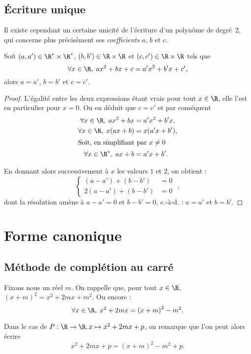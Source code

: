 \subsection{Écriture unique}
Il existe cependant un certaine unicité de l'écriture d'un polynôme de degré~2, qui concerne plus précisément ses \emph{coefficients} $a$, $b$ et $c$.
\begin{thm}
Soit $(a,a')\in\R^*\times\R^*$, $(b,b')\in\R\times\R$ et $(c,c')\in\R\times\R$ tels que
\[\forall x\in\R,\; ax^2+bx+c=a'x^2+b'x+c',\]
alors $a=a'$, $b=b'$ et $c=c'$. 
\label{thunicite}
\end{thm}
\begin{proof}
L'égalité entre les deux expressions étant vraie pour tout $x\in\R$, elle l'est en particulier pour $x=0$. On en déduit que $c=c'$ et par conséquent
\begin{align*}
\forall x\in\R,\; ax^2+bx&=a'x^2+b'x,\\
\forall x\in\R,\; x(ax+b)&=x(a'x+b'),\\
\intertext{Soit, en simplifiant par $x\neq0$}
\forall x\in\R^*,\;ax+b&=a'x+b'.
\end{align*}

En donnant alors successivement à $x$ les valeurs $1$ et $2$, on obtient :
\[\left\{\begin{aligned}
(a-a')+(b-b')&=0\\
2(a-a')+(b-b')&=0
\end{aligned}\right.\;,\]
dont la résolution amène à $a-a'=0$ et $b-b'=0$, c.-à-d. : $a=a'$ et $b=b'$.
\end{proof}

\section{Forme canonique}
\subsection{Méthode de complétion au carré}\label{sec2-1}
Fixons nous un réel $m$. On rappelle que, pour tout $x\in\R$, $(x+m)^2=x^2+2mx+m^2$. Ou encore :
\begin{equation}
\forall x\in\R, \; x^2+2mx=\left(x+m\right)^2-m^2.
\end{equation}

Dans le cas de $P : \R\rightarrow\R, x\mapsto x^2+2mx+p$, on remarque que l'on peut alors écrire 
\begin{equation}
x^2+2mx+p=\left(x+m\right)^2-m^2+p.\label{eqfcreduite}
\end{equation}

